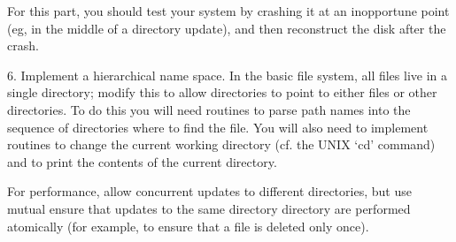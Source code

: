 For this part, you should test your system by crashing it at an
inopportune point (eg, in the middle of a directory update), and 
then reconstruct the disk after the crash.

\item{6.}
Implement a hierarchical name space.  In the basic file system,
all files live in a single directory; modify this to allow
directories to point to either files or other directories.
To do this you will need routines to parse path names into
the sequence of directories where to find the file.
You will also need to implement routines to change the 
current working directory (cf. the UNIX `cd' command) and to 
print the contents of the current directory.

For performance, allow concurrent updates to different directories,
but use mutual ensure that updates to the same directory directory
are performed atomically (for example, to ensure that a file is
deleted only once).


